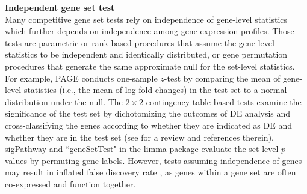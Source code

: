 \documentclass[useAMS,usenatbib, galley]{biom}
\newcommand{\gen}{geneSetTest}
\begin{document}
	
	\textbf{Independent gene set test} \\
	Many competitive gene set tests rely on independence of gene-level statistics which further depends on independence among gene expression profiles. Those tests are parametric or rank-based procedures that assume the gene-level statistics to be independent and identically distributed, or gene permutation procedures that generate the same approximate null for the set-level statistics. For example, PAGE  \citep{kim2005page} conducts one-sample $z$-test by comparing the mean of gene-level statistics (i.e., the mean of log fold changes) in the test set to a normal distribution under the null. The $2\times 2$ contingency-table-based tests examine the significance of the test set by dichotomizing the outcomes of DE analysis and cross-classifying the genes according to whether they are indicated as DE and whether they are in the test set (see \cite{huang2009bioinformatics} for a review and references therein). sigPathway \citep{tian2005discovering} and ``\gen" in the limma package \citep{Smyth2004moderated} evaluate the set-level $p$-values by permuting gene labels. However, tests assuming independence of genes may result in inflated false discovery rate \citep{efron2007testing,goeman2007analyzing, gatti2010heading,wu2012camera,yaari2013quantitative}, as genes within a gene set are often co-expressed and function together.
	
\end{document}
